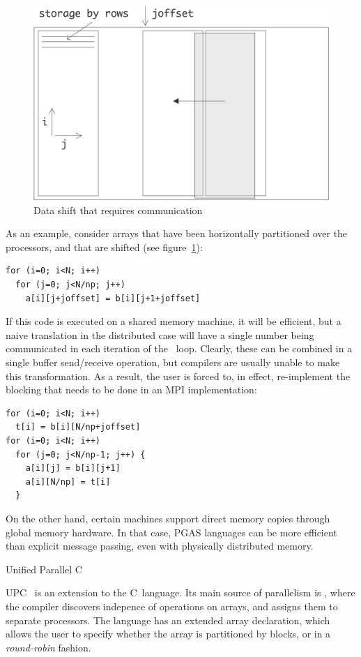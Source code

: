 \begin{figure}[ht]
  \includegraphics[scale=.12]{graphics-public/abshift}
  \caption{Data shift that requires communication}
  \label{fig:abshift}
\end{figure}
As an example, consider arrays  that have been horizontally
partitioned over the processors, and that are shifted (see figure~\ref{fig:abshift}):
\begin{verbatim}
for (i=0; i<N; i++)
  for (j=0; j<N/np; j++)
    a[i][j+joffset] = b[i][j+1+joffset]
\end{verbatim}
If this code is executed on a shared memory machine, it will be
efficient, but a naive translation in the distributed case will have a
single number being communicated in each iteration of the
~loop. Clearly, these can be combined in a single buffer
send/receive operation, but compilers are usually
unable to make this transformation. As a result, the user is forced
to, in effect, re-implement the blocking that needs to be done in an
MPI implementation:
\begin{verbatim}
for (i=0; i<N; i++)
  t[i] = b[i][N/np+joffset]
for (i=0; i<N; i++)
  for (j=0; j<N/np-1; j++) {
    a[i][j] = b[i][j+1]
    a[i][N/np] = t[i]
  }
\end{verbatim}

On the other hand, certain machines support direct memory copies
through global memory hardware. In that case, \ac{PGAS} languages can
be more efficient than explicit message passing, even with physically
distributed memory.

 {Unified Parallel C}

\acf{UPC}~\cite{UPC:homepage} is an extension to the C~language.  Its
main source of parallelism is , where
the compiler discovers indepence of operations on
arrays, and assigns them to separate processors. The language has an
extended array declaration, which allows the user to specify whether
the array is partitioned by blocks, or in a
\emph{round-robin}
fashion.


